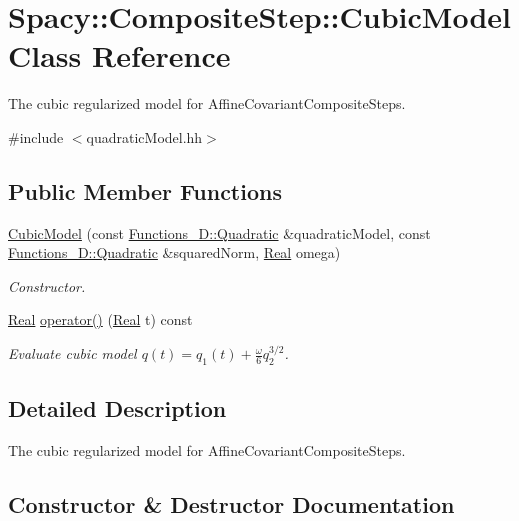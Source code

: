 \hypertarget{classSpacy_1_1CompositeStep_1_1CubicModel}{}\section{Spacy\+:\+:Composite\+Step\+:\+:Cubic\+Model Class Reference}
\label{classSpacy_1_1CompositeStep_1_1CubicModel}


The cubic regularized model for Affine\+Covariant\+Composite\+Steps.  




{\ttfamily \#include $<$quadratic\+Model.\+hh$>$}

\subsection*{Public Member Functions}
\begin{DoxyCompactItemize}
\item 
\hyperlink{classSpacy_1_1CompositeStep_1_1CubicModel_abbae58ccfdd50120fc10245251048b91_abbae58ccfdd50120fc10245251048b91}{Cubic\+Model} (const \hyperlink{classSpacy_1_1Functions__1D_1_1Quadratic}{Functions\+\_\+D\+::\+Quadratic} \&quadratic\+Model, const \hyperlink{classSpacy_1_1Functions__1D_1_1Quadratic}{Functions\+\_\+D\+::\+Quadratic} \&squared\+Norm, \hyperlink{classSpacy_1_1Real}{Real} omega)
\begin{DoxyCompactList}\small\item\em Constructor. \end{DoxyCompactList}\item 
\hyperlink{classSpacy_1_1Real}{Real} \hyperlink{classSpacy_1_1CompositeStep_1_1CubicModel_a5669f387117cfdc47b5be45a29f387ce_a5669f387117cfdc47b5be45a29f387ce}{operator()} (\hyperlink{classSpacy_1_1Real}{Real} t) const 
\begin{DoxyCompactList}\small\item\em Evaluate cubic model $ q(t) = q_1(t) + \frac{\omega}{6}q_2^{3/2} $. \end{DoxyCompactList}\end{DoxyCompactItemize}


\subsection{Detailed Description}
The cubic regularized model for Affine\+Covariant\+Composite\+Steps. 

\subsection{Constructor \& Destructor Documentation}
\hypertarget{classSpacy_1_1CompositeStep_1_1CubicModel_abbae58ccfdd50120fc10245251048b91_abbae58ccfdd50120fc10245251048b91}{}
